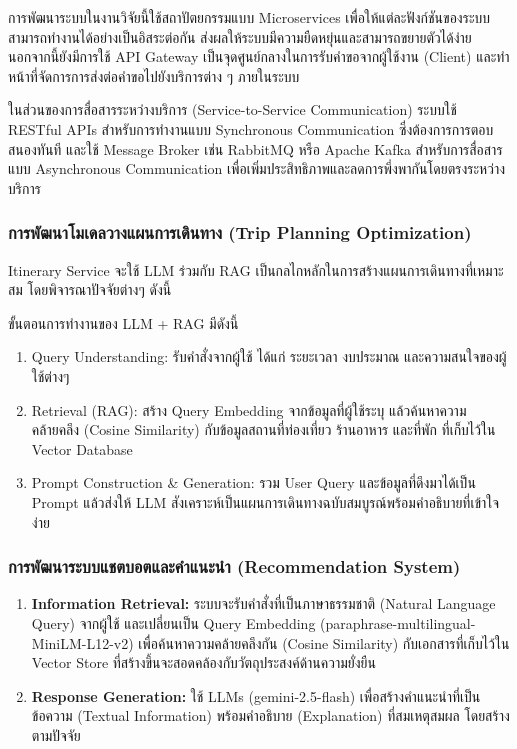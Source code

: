 การพัฒนาระบบในงานวิจัยนี้ใช้สถาปัตยกรรมแบบ Microservices เพื่อให้แต่ละฟังก์ชันของระบบสามารถทำงานได้อย่างเป็นอิสระต่อกัน ส่งผลให้ระบบมีความยืดหยุ่นและสามารถขยายตัวได้ง่าย นอกจากนี้ยังมีการใช้ API Gateway เป็นจุดศูนย์กลางในการรับคำขอจากผู้ใช้งาน (Client) และทำหน้าที่จัดการการส่งต่อคำขอไปยังบริการต่าง ๆ ภายในระบบ

ในส่วนของการสื่อสารระหว่างบริการ (Service-to-Service Communication) ระบบใช้ RESTful APIs สำหรับการทำงานแบบ Synchronous Communication ซึ่งต้องการการตอบสนองทันที และใช้ Message Broker เช่น RabbitMQ หรือ Apache Kafka สำหรับการสื่อสารแบบ Asynchronous Communication เพื่อเพิ่มประสิทธิภาพและลดการพึ่งพากันโดยตรงระหว่างบริการ

\subsubsection{การพัฒนาโมเดลวางแผนการเดินทาง (Trip Planning Optimization)}

Itinerary Service จะใช้ LLM ร่วมกับ RAG เป็นกลไกหลักในการสร้างแผนการเดินทางที่เหมาะสม โดยพิจารณาปัจจัยต่างๆ ดังนี้

ขั้นตอนการทำงานของ LLM + RAG มีดังนี้
\begin{enumerate}[leftmargin=1.8cm]
\item Query Understanding: รับคำสั่งจากผู้ใช้ ได้แก่ ระยะเวลา งบประมาณ และความสนใจของผู้ใช้ต่างๆ
\item Retrieval (RAG): สร้าง Query Embedding จากข้อมูลที่ผู้ใช้ระบุ แล้วค้นหาความคล้ายคลึง (Cosine Similarity) กับข้อมูลสถานที่ท่องเที่ยว ร้านอาหาร และที่พัก ที่เก็บไว้ใน Vector Database
\item Prompt Construction \& Generation: รวม User Query และข้อมูลที่ดึงมาได้เป็น Prompt แล้วส่งให้ LLM สังเคราะห์เป็นแผนการเดินทางฉบับสมบูรณ์พร้อมคำอธิบายที่เข้าใจง่าย
\end{enumerate}

\subsubsection{การพัฒนาระบบแชตบอตและคำแนะนำ (Recommendation System)}

\begin{enumerate}[leftmargin=1.8cm]
\item \textbf{Information Retrieval:} ระบบจะรับคำสั่งที่เป็นภาษาธรรมชาติ (Natural Language Query) จากผู้ใช้ และเปลี่ยนเป็น Query Embedding (paraphrase-multilingual-MiniLM-L12-v2) เพื่อค้นหาความคล้ายคลึงกัน (Cosine Similarity) กับเอกสารที่เก็บไว้ใน Vector Store ที่สร้างขึ้นจะสอดคล้องกับวัตถุประสงค์ด้านความยั่งยืน
\item \textbf{Response Generation:} ใช้ LLMs (gemini-2.5-flash) เพื่อสร้างคำแนะนำที่เป็นข้อความ (Textual Information) พร้อมคำอธิบาย (Explanation) ที่สมเหตุสมผล โดยสร้างตามปัจจัย
\end{enumerate}


